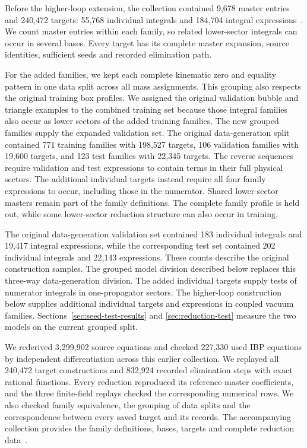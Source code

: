 \documentclass[11pt,a4paper]{article}
\begin{document}
Before the higher-loop extension, the collection contained 9,678 master entries and
240,472 targets: 55,768 individual integrals and 184,704
integral expressions~\cite{ExpandedIntegralData}. We count master entries
within each family, so related lower-sector integrals can
occur in several bases. Every target has its complete master expansion,
source identities, sufficient seeds and recorded elimination path.

For the added families, we kept each complete kinematic zero and
equality pattern in one data split across all mass assignments.
This grouping also respects the original training box profiles.
We assigned the original validation bubble and triangle examples to
the combined training set because those integral families also occur
as lower sectors of the added training families. The new grouped
families supply the expanded validation set.
The original data-generation split contained 771 training families with
198,527 targets, 106 validation families with 19,600 targets,
and 123 test families with 22,345 targets. The reverse sequences
require validation and test expressions to contain terms in their full
physical sectors. The additional individual targets instead require
all four family expressions to occur, including those in the numerator.
Shared lower-sector masters remain part of the family definitions.
The complete family profile is held out, while some lower-sector
reduction structure can also occur in training.

The original data-generation validation set contained 183 individual integrals and
19,417 integral expressions, while the corresponding test set contained 202
individual integrals and 22,143 expressions. These counts describe
the original construction samples. The grouped model division
described below replaces this three-way data-generation division. The added individual targets
supply tests of numerator integrals in one-propagator sectors.
The higher-loop construction below supplies additional individual targets and expressions in coupled vacuum families. Sections~\ref{sec:seed-test-results} and \ref{sec:reduction-test}
measure the two models on the current grouped split.

We rederived 3,299,902 source equations and checked 227,330
used IBP equations by independent differentiation across this earlier
collection. We replayed all 240,472 target constructions and 832,924
recorded elimination steps with exact rational functions.
Every reduction reproduced its reference master coefficients, and
the three finite-field replays checked the corresponding numerical
rows. We also checked family equivalence, the grouping of data splits
and the correspondence between every saved target and its records.
The accompanying collection provides the family definitions, bases,
targets and complete reduction data~\cite{ExpandedIntegralData}.
\end{document}
